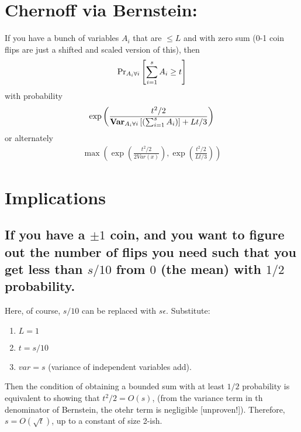

\section{Chernoff via Bernstein:}
  If you have a bunch of variables $A_i$ that are $\leq L$ and with zero sum (0-1 coin flips are just a shifted and scaled version of this), then
  \begin{align}
  \mbox{Pr}_{A_i \forall i}\left[ \sum_{i=1}^s A_i \geq t \right]
  \end{align}
  with probability 
  \begin{align}
    \exp\left(\frac{t^2/2}{\mbox{\bf Var}_{A_i \forall i}\left[ (\sum_{i=1}^s A_i) \right] + Lt/3}\right)
  \end{align}
  or alternately
  \begin{align}
    \max\left(\exp\left(\frac{t^2/2}{2Var(x)}\right), \exp\left(\frac{t^2/2}{Lt/3}\right)\right)
  \end{align}

  \section{Implications}
  \subsection{If you have a $\pm 1$ coin, and you want to figure out the number of flips you need such that you get less than $s/10$ from $0$ (the mean) with $1/2$ probability.}
  Here, of course, $s/10$ can be replaced with $s\epsilon$.
  Substitute:
  \begin{enumerate}
    \item $L = 1$
    \item $t = s/10$
    \item $var= s$ (variance of independent variables add).
  \end{enumerate}
  Then the condition of obtaining a bounded sum with at least $1/2$ probability is equivalent to showing that $t^2/2 = O(s)$, (from the variance term in th denominator of Bernstein, the otehr term is negligible [unproven!]).
  Therefore, $s = O(\sqrt{t})$, up to a constant of size 2-ish.
